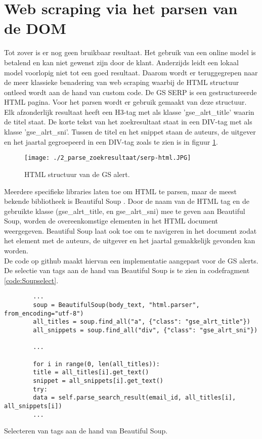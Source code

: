 \section{Web scraping via het parsen van de DOM}
Tot zover is er nog geen bruikbaar resultaat. Het gebruik van een online model is betalend en kan niet gewenst zijn door de klant. Anderzijds leidt een lokaal model voorlopig niet tot een goed resultaat. Daarom wordt er teruggegrepen naar de meer klassieke benadering van web scraping waarbij de HTML structuur ontleed wordt aan de hand van custom code.
De GS SERP is een gestructureerde HTML pagina. Voor het parsen wordt er gebruik gemaakt van deze structuur.
Elk afzonderlijk resultaat heeft een H3-tag met als klasse 'gse\_alrt\_title' waarin de titel staat. De korte tekst van het zoekresultaat staat in een DIV-tag met als klasse 'gse\_alrt\_sni'. Tussen de titel en het snippet staan de auteurs, de uitgever en het jaartal gegroepeerd in een DIV-tag zoals te zien is in figuur \ref{fig:serp_html}.
\begin{figure}[h!]
    \centering
    \texttt{[image: ./2\_parse\_zoekresultaat/serp-html.JPG]}
    \caption[HTML structuur van de GS alert.]{\label{fig:serp_html}HTML structuur van de GS alert.}
\end{figure}
\FloatBarrier
Meerdere specifieke libraries laten toe om HTML te parsen, maar de meest bekende bibliotheek is Beautiful Soup \autocite{Soup2025}. Door de naam van de HTML tag en de gebruikte klasse (gse\_alrt\_title, en gse\_alrt\_sni) mee te geven aan Beautiful Soup, worden de overeenkomstige elementen in het HTML document weergegeven. Beautiful Soup laat ook toe om te navigeren in het document zodat het element met de auteurs, de uitgever en het jaartal gemakkelijk gevonden kan worden.\\
De code op github \textcite{DepaepeBeautifulsoup2025} maakt hiervan een implementatie aangepast voor de GS alerts. 
De selectie van tags aan de hand van Beautiful Soup is te zien in codefragment \ref{code:Soupselect}.
\begin{listing}[h!]
    \begin{verbatim}
        ...
        soup = BeautifulSoup(body_text, "html.parser", from_encoding="utf-8")
        all_titles = soup.find_all("a", {"class": "gse_alrt_title"})
        all_snippets = soup.find_all("div", {"class": "gse_alrt_sni"})
        
        ...
        
        for i in range(0, len(all_titles)):
        title = all_titles[i].get_text()
        snippet = all_snippets[i].get_text()
        try:
        data = self.parse_search_result(email_id, all_titles[i], all_snippets[i])
        ...
    \end{verbatim}
    \caption[Beautiful Soup tag selection]{Selecteren van tags aan de hand van Beautiful Soup.}
    \label{code:Soupselect}
\end{listing}
